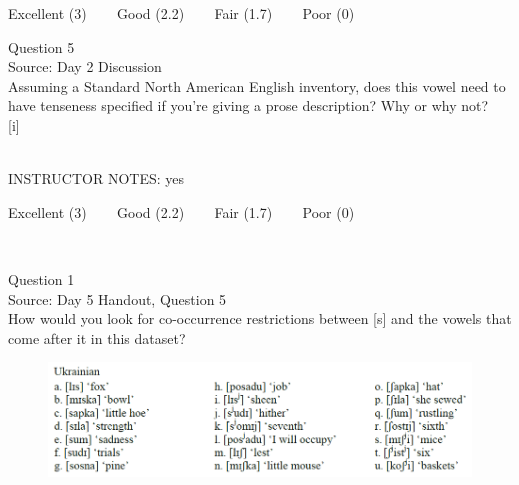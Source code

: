 \documentclass[12pt]{article}
\begin{document}
\vfill
Excellent (3) ~~~ Good (2.2) ~~~ Fair (1.7) ~~~ Poor (0)
\newpage

{\large Question 5}\\

Source: Day 2 Discussion\\

Assuming a Standard North American English inventory, does this vowel need to have tenseness specified if you're giving a prose description? Why or why not?\\

{[i]}


~\\
INSTRUCTOR NOTES: yes


\vfill
Excellent (3) ~~~ Good (2.2) ~~~ Fair (1.7) ~~~ Poor (0)
\newpage

\begin{center}
\textbf{{\color{red}{\HUGE END OF EXAM}}}\\

\end{center}
\newpage

\begin{center}
\textbf{{\color{blue}{\HUGE START OF EXAM\\}}}

\textbf{{\color{blue}{\HUGE Student ID: 5540\\}}}

\textbf{{\color{blue}{\HUGE 3:45 - 4:00 PM\\}}}

\end{center}
\newpage

{\large Question 1}\\

Source: Day 5 Handout, Question 5\\

How would you look for co-occurrence restrictions between [s] and the vowels that come after it in this dataset?\\

\begin{figure}[H]
\includegraphics{../images/ukrainian.png}
\end{figure}
\end{document}
